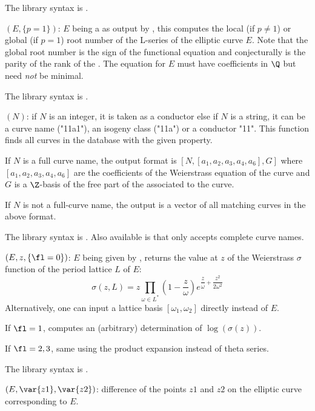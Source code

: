 The library syntax is .

$(E,\{p=1\})$: \label{se:ellrootno}
$E$ being a  as output by
, this computes the local (if $p\neq 1$) or global (if $p=1$)
root number of the L-series of the elliptic curve $E$. Note that the global
root number is the sign of the functional equation and conjecturally is the
parity of the rank of the . The equation for $E$ must
have coefficients in $\Q$ but need \emph{not} be minimal.

The library syntax is .

$(N)$: \label{se:ellsearch}if $N$ is an integer, it is taken as a conductor else if $N$ is a
string, it can be a curve name ("11a1"), an isogeny class ("11a") or a
conductor "11". This function finds all curves in the  database
with the given property.

If $N$ is a full curve name, the output format is $[N, [a_1,a_2,a_3,a_4,a_6],
G]$ where $[a_1,a_2,a_3,a_4,a_6]$ are the coefficients of the Weierstrass
equation of the curve and $G$ is a $\Z$-basis of the free part of the
 associated to the curve.

If $N$ is not a full-curve name, the output is a vector of all matching
curves in the above format.

The library syntax is .
Also available is  that only
accepts complete curve names.

$(E,z,\{\fl=0\})$: \label{se:ellsigma}
$E$ being given by ,
returns the value at $z$ of the Weierstrass $\sigma$ function of the period
lattice $L$ of $E$:
$$ \sigma(z, L) = z \prod_{\omega\in L^*} \left(1 -
\dfrac{z}{\omega}\right)e^{\dfrac{z}{\omega} + \dfrac{z^2}{2\omega^2}}$$
Alternatively, one can input a lattice basis $[\omega_1,\omega_2]$ directly
instead of $E$.

If $\fl=1$, computes an (arbitrary) determination of $\log(\sigma(z))$.

If $\fl=2,3$, same using the product expansion instead of theta series.

The library syntax is .

$(E,\var{z1},\var{z2})$: \label{se:ellsub}
difference of the points $z1$ and $z2$ on the
elliptic curve corresponding to $E$.

